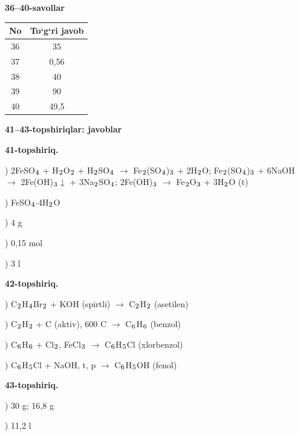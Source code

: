 \documentclass[11pt,a4paper]{article}
\renewcommand{\textsubscript}[1]{\ensuremath{_{\text{\fontsize{8}{8}\selectfont #1}}}}
\begin{document}
\noindent\textbf{36--40-savollar}\par\smallskip
\noindent\begin{tabular}{|c|c|}\hline \textbf{No} & \textbf{To`g`ri javob}\\\hline
36 & 35\\\hline
37 & 0,56\\\hline
38 & 40\\\hline
39 & 90\\\hline
40 & 49,5\\\hline
\end{tabular}\par\medskip
\noindent\textbf{41--43-topshiriqlar: javoblar}\par\smallskip
\noindent\textbf{41-topshiriq.}\par
{}) 2FeSO\textsubscript{4} + H\textsubscript{2}O\textsubscript{2} + H\textsubscript{2}SO\textsubscript{4} $\to$ Fe\textsubscript{2}(SO\textsubscript{4})\textsubscript{3} + 2H\textsubscript{2}O; Fe\textsubscript{2}(SO\textsubscript{4})\textsubscript{3} + 6NaOH $\to$ 2Fe(OH)\textsubscript{3}$\downarrow$ + 3Na\textsubscript{2}SO\textsubscript{4}; 2Fe(OH)\textsubscript{3} $\to$ Fe\textsubscript{2}O\textsubscript{3} + 3H\textsubscript{2}O (t)\par
{}) FeSO\textsubscript{4}$\cdot$4H\textsubscript{2}O\par
{}) 4 g\par
{}) 0,15 mol\par
{}) 3 l\par
\noindent\textbf{42-topshiriq.}\par
{}) C\textsubscript{2}H\textsubscript{4}Br\textsubscript{2} + KOH (spirtli) $\to$ C\textsubscript{2}H\textsubscript{2} (asetilen)\par
{}) C\textsubscript{2}H\textsubscript{2} + C (aktiv), 600 \textdegree{}C $\to$ C\textsubscript{6}H\textsubscript{6} (benzol)\par
{}) C\textsubscript{6}H\textsubscript{6} + Cl\textsubscript{2}, FeCl\textsubscript{3} $\to$ C\textsubscript{6}H\textsubscript{5}Cl (xlorbenzol)\par
{}) C\textsubscript{6}H\textsubscript{5}Cl + NaOH, t\textdegree{}, p $\to$ C\textsubscript{6}H\textsubscript{5}OH (fenol)\par
\noindent\textbf{43-topshiriq.}\par
{}) 30 g; 16,8 g\par
{}) 11,2 l\par
\end{document}

